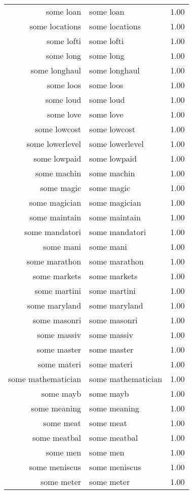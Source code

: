 \begin{table}[ht]
\begin{tabular}{rlr}
  some loan & some loan & 1.00 \\ 
  some locations & some locations & 1.00 \\ 
  some lofti & some lofti & 1.00 \\ 
  some long & some long & 1.00 \\ 
  some longhaul & some longhaul & 1.00 \\ 
  some loos & some loos & 1.00 \\ 
  some loud & some loud & 1.00 \\ 
  some love & some love & 1.00 \\ 
  some lowcost & some lowcost & 1.00 \\ 
  some lowerlevel & some lowerlevel & 1.00 \\ 
  some lowpaid & some lowpaid & 1.00 \\ 
  some machin & some machin & 1.00 \\ 
  some magic & some magic & 1.00 \\ 
  some magician & some magician & 1.00 \\ 
  some maintain & some maintain & 1.00 \\ 
  some mandatori & some mandatori & 1.00 \\ 
  some mani & some mani & 1.00 \\ 
  some marathon & some marathon & 1.00 \\ 
  some markets & some markets & 1.00 \\ 
  some martini & some martini & 1.00 \\ 
  some maryland & some maryland & 1.00 \\ 
  some masonri & some masonri & 1.00 \\ 
  some massiv & some massiv & 1.00 \\ 
  some master & some master & 1.00 \\ 
  some materi & some materi & 1.00 \\ 
  some mathematician & some mathematician & 1.00 \\ 
  some mayb & some mayb & 1.00 \\ 
  some meaning & some meaning & 1.00 \\ 
  some meat & some meat & 1.00 \\ 
  some meatbal & some meatbal & 1.00 \\ 
  some men & some men & 1.00 \\ 
  some meniscus & some meniscus & 1.00 \\ 
  some meter & some meter & 1.00 \\ 

\end{tabular}
\end{table}
